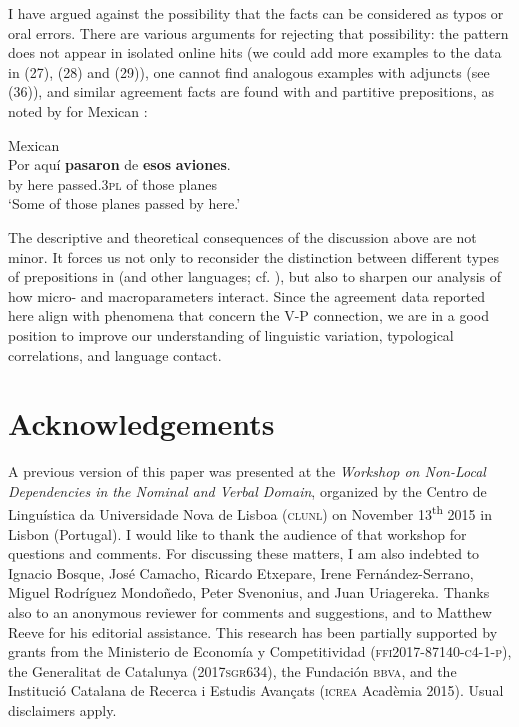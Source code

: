 \documentclass[output=paper]{langsci/langscibook}
\begin{document}
I have argued against the possibility that the facts can be considered as typos or oral errors. There are various arguments for rejecting that possibility: the pattern does not appear in isolated online hits (we could add more examples to the data in (27), (28) and (29)), one cannot find analogous examples with adjuncts (see (36)), and similar agreement facts are found with \DOM and partitive prepositions, as noted by \citet{Treviño2010} for Mexican :

 
\ea%
    Mexican \label{ex:gallego:43}\\
    \gll Por  aquí   \textbf{pasaron}      de  \textbf{esos}   \textbf{aviones}. \\
         by    here  passed.\textsc{3pl}  of  those  planes\\
    \glt ‘Some of those planes passed by here.’
\z

The descriptive and theoretical consequences of the discussion above are not minor. It forces us not only to reconsider the distinction between different types of prepositions in  (and other languages; cf. \citealt{Demonte1987,Demonte1991,Demonte1995,Abels2003,Cuervo2003,Pesetsky2004,Romero2011}), but also to sharpen our analysis of how micro- and macroparameters interact. Since the agreement data reported here align with phenomena that concern the V-P connection, we are in a good position to improve our understanding of linguistic variation, typological correlations, and language contact.


\section*{Acknowledgements}
A previous version of this paper was presented at the \textit{Workshop on Non-Local Dependencies in the Nominal and Verbal Domain}, organized by the Centro de Linguística da Universidade Nova de Lisboa (\textsc{clunl}) on November 13\textsuperscript{th} 2015 in Lisbon (Portugal). I would like to thank the audience of that workshop for questions and comments. For discussing these matters, I am also indebted to Ignacio Bosque, José Camacho, Ricardo Etxepare, Irene Fernández-Serrano, Miguel Rodríguez Mondoñedo, Peter Svenonius, and Juan Uriagereka. Thanks also to an anonymous reviewer for comments and suggestions, and to Matthew Reeve for his editorial assistance. This research has been partially supported by grants from the Ministerio de Economía y Competitividad (\textsc{ffi2017-87140-c4-1-p}), the Generalitat de Catalunya (\textsc{2017sgr634}), the Fundación \textsc{bbva}, and the Institució Catalana de Recerca i Estudis Avançats (\textsc{icrea} Acadèmia 2015). Usual disclaimers apply.
\end{document}
